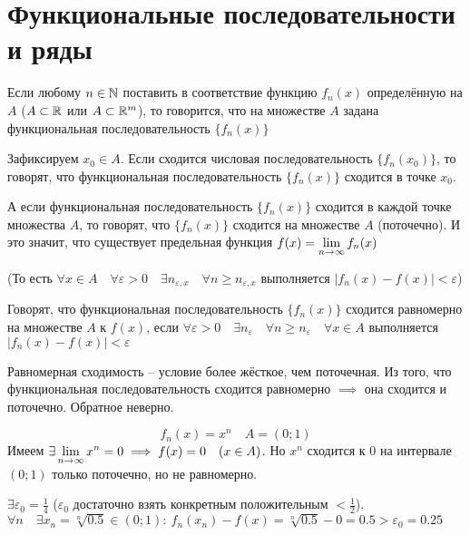 \section{Функциональные последовательности и ряды}

\begin{definition}
    Если любому $n \in \mathbb{N}$ поставить в соответствие функцию $f_n(x)$
    определённую на $A$ ($A \subset \mathbb{R}$ или $A \subset \mathbb{R}^m$), то говорится,
    что на множестве $A$ задана функциональная последовательность $\{ f_n(x) \}$
\end{definition}

\begin{definition}
    Зафиксируем $x_0 \in A$. Если сходится числовая последовательность
    $\{ f_n(x_0) \}$, то говорят, что функциональная последовательность
    $\{ f_n(x) \}$ сходится в точке $x_0$.

    А если функциональная последовательность $\{ f_n(x) \}$ сходится в
    каждой точке множества $A$, то говорят, что $\{ f_n(x) \}$ сходится на
    множестве $A$ (поточечно). И это значит, что существует предельная
    функция $f(x) = \displaystyle\lim_{n \to \infty} f_n(x)$

    (То есть $\forall x \in A \quad \forall \varepsilon > 0 \quad
    \exists n_{\varepsilon,x} \quad \forall n \geq n_{\varepsilon,x}$
    выполняется $|f_n(x) - f(x)| < \varepsilon$)
\end{definition}

\begin{definition}
    Говорят, что функциональная последовательность $\{ f_n(x) \}$ сходится
    равномерно на множестве $A$ к $f(x)$, если
    $\forall \varepsilon > 0 \quad \exists n_\varepsilon \quad
    \forall n \geq n_\varepsilon \quad \forall x \in A$ выполняется
    $|f_n(x) - f(x)| < \varepsilon$
\end{definition}

\begin{example}
    Равномерная сходимость -- условие более жёсткое, чем поточечная. Из того,
    что функциональная последовательность сходится равномерно $\implies$
    она сходится и поточечно. Обратное неверно.

    \[ f_n(x) = x^n \quad A = (0; 1) \]
    Имеем $\exists \displaystyle\lim_{n \to \infty} x^n = 0 \implies f(x) = 0 \quad (x \in A)$.
    Но $x^n$ сходится к 0 на интервале $(0; 1)$ только поточечно, но не
    равномерно.

    $\exists \varepsilon_0 = \frac{1}{4}$ ($\varepsilon_0$ достаточно взять
    конкретным положительным $< \frac{1}{2}$).
    $\forall n \quad \exists x_n = \sqrt[n]{0.5} \in (0; 1): \: f_n(x_n) - f(x) =
    \sqrt[n]{0.5} - 0 = 0.5 > \varepsilon_0 = 0.25$
\end{example}

